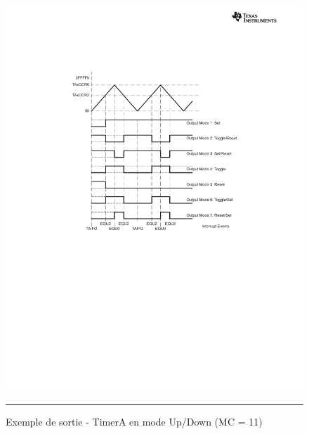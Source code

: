 \begin{figure}[t]
  \centering
  \includegraphics[angle=0, width=14cm]{./Figures/Chap5_Timer/Timer_Out3.pdf}
  \rule{35em}{0.5pt}
  \caption[Outmod_MC3]{Exemple de sortie - TimerA en mode Up/Down (MC = 11)}
  \label{fig:Outmod_MC3}
\end{figure}








